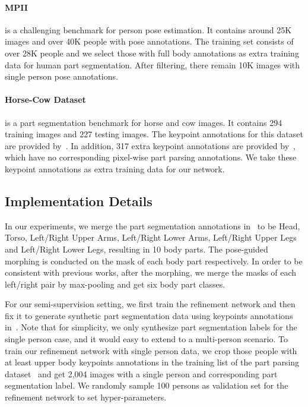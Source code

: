 \documentclass[10pt,twocolumn,letterpaper]{article}
\begin{document}
\paragraph{MPII~\cite{andriluka14cvpr}} is a challenging benchmark for person pose estimation. It contains around 25K images and over 40K people with pose annotations. The training set consists of over 28K people and we select those with full body annotations as extra training data for human part segmentation. After filtering, there remain 10K images with single person pose annotations.
\vspace{-3mm}
\paragraph{Horse-Cow Dataset~\cite{wang2015semantic}} is a part segmentation benchmark for horse and cow images. It contains 294 training images and 227 testing images. The keypoint annotations for this dataset are provided by~\cite{PoseletsPAMI}. In addition, 317 extra keypoint annotations are provided by~\cite{PoseletsPAMI}, which have no corresponding pixel-wise part parsing annotations. We take these keypoint annotations as extra training data for our network.
\subsection{Implementation Details}
\label{sec:implem}
In our experiments, we merge the part segmentation annotations in~\cite{chen2014detect} to be Head, Torso, Left/Right Upper Arms, Left/Right Lower Arms, Left/Right Upper Legs and Left/Right Lower Legs, resulting in 10 body parts. The pose-guided morphing is conducted on the mask of each body part respectively. In order to be consistent with previous works, after the morphing, we merge the masks of each left/right pair by max-pooling and get six body part classes.

For our semi-supervision setting, we first train the refinement network and then fix it to generate synthetic part segmentation data using keypoints annotations in~\cite{andriluka14cvpr}. Note that for simplicity, we only synthesize part segmentation labels for the single person case, and it would easy to extend to a multi-person scenario. To train our refinement network with single person data, we crop those people with at least upper body keypoints annotations in the training list of the part parsing dataset~\cite{chen2014detect} and get 2,004 images with a single person and corresponding part segmentation label. We randomly sample 100 persons as validation set for the refinement network to set hyper-parameters.
\end{document}
